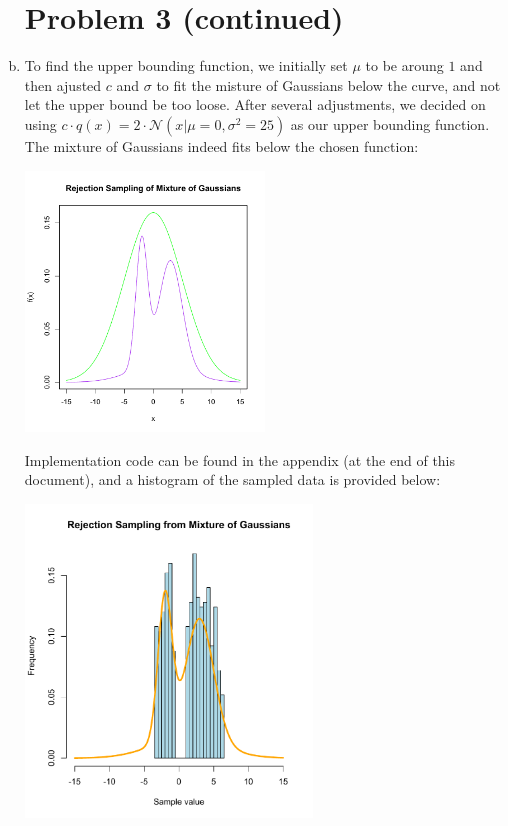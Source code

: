 \documentclass{article}
\begin{document}
\begin{enumerate}[(a)]
    \newpage
    \section*{Problem 3 (continued)}
            \item
                To find the upper bounding function, we initially set $\mu$ to be aroung $1$ and then ajusted $c$ and $\sigma$ to fit the misture of Gaussians below the curve, and not let the upper bound be too loose. After several adjustments, we decided on using $c\cdot q(x)=2\cdot\mathcal{N}(x|\mu=0, \sigma^2=25)$ as our upper bounding function. The mixture of Gaussians indeed fits below the chosen function:
                
                \begin{center}
                    \includegraphics[width=0.5\textwidth]{graph3c}
                \end{center}

                Implementation code can be found in the appendix (at the end of this document), and a histogram of the sampled data is provided below:
                
                \begin{center}
                    \includegraphics[width=0.6\textwidth]{graph3c2}
                \end{center}
    \newpage

\end{enumerate}
\end{document}
